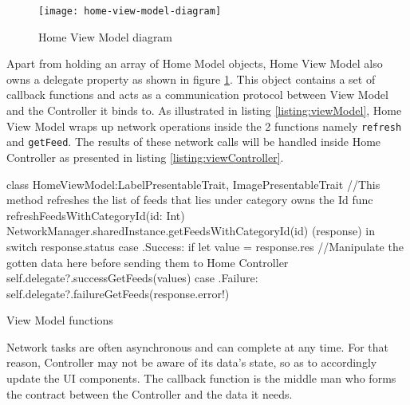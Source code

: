 \documentclass[11pt,a4paper,oneside,article]{memoir}
\begin{document}
\begin{figure}[H]

\centering
\texttt{[image: home-view-model-diagram]}

\caption{Home View Model diagram}
\label{fig:homeViewModel}

\end{figure}

Apart from holding an array of Home Model objects, Home View Model also owns a delegate property as shown in figure \ref{fig:homeViewModel}. This object contains a set of \gls{callback} functions and acts as a communication protocol between View Model and the Controller it binds to. As illustrated in listing \ref{listing:viewModel}, Home View Model wraps up network operations inside the 2 functions namely \texttt{refresh} and \texttt{getFeed}. The results of these network calls will be handled inside Home Controller as presented in listing \ref{listing:viewController}.

\begin{listing}[H]
\begin{SwiftCode}

class HomeViewModel:LabelPresentableTrait, ImagePresentableTrait{
    //This method refreshes the list of feeds that lies under category owns the Id
    func refreshFeedsWithCategoryId(id: Int){
        NetworkManager.sharedInstance.getFeedsWithCategoryId(id){ (response) in
            switch response.status{
            case .Success:
                if let value = response.res{
        //Manipulate the gotten data here before sending them to Home Controller
                    self.delegate?.successGetFeeds(values)
                }
            case .Failure:
                self.delegate?.failureGetFeeds(response.error!)
            }
        }
    }
}

\end{SwiftCode}
\caption{View Model functions}
\label{listing:viewModel}
\end{listing}

Network tasks are often asynchronous and can complete at any time. For that reason, Controller may not be aware of its data's state, so as to accordingly update the UI components. The \gls{callback} function is the middle man who forms the contract between the Controller and the data it needs.
\end{document}
